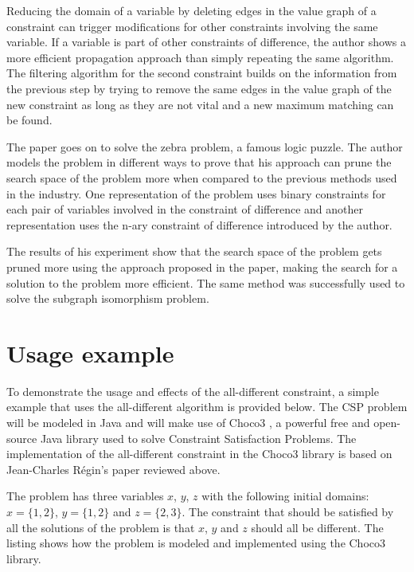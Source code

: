 \documentclass{l4proj}
\begin{document}
\noindent Reducing the domain of a variable by deleting edges in the value graph of a constraint can trigger modifications for other constraints involving the same variable. If a variable is part of other constraints of difference, the author shows a more efficient propagation approach than simply repeating the same algorithm. The filtering algorithm for the second constraint builds on the information from the previous step by trying to remove the same edges in the value graph of the new constraint as long as they are not vital and a new maximum matching can be found.

\noindent The paper goes on to solve the zebra problem, a famous logic puzzle. The author models the problem in different ways to prove that his approach can prune the search space of the problem more when compared to the previous methods used in the industry. One representation of the problem uses binary constraints for each pair of variables involved in the constraint of difference and another representation uses the n-ary constraint of difference introduced by the author. 

\noindent The results of his experiment show that the search space of the problem gets pruned more using the approach proposed in the paper, making the search for a solution to the problem more efficient. The same method was successfully used to solve the subgraph isomorphism problem. 

\section{Usage example}
\noindent To demonstrate the usage and effects of the all-different constraint, a simple example that uses the all-different algorithm is provided below. The CSP problem will be modeled in Java and will make use of Choco3 \cite{choco}, a powerful free and open-source Java library used to solve Constraint Satisfaction Problems. The implementation of the all-different constraint in the Choco3 library is based on Jean-Charles R\'egin's paper \cite{regin1994filtering} reviewed above.

\noindent The problem has three variables $x$, $y$, $z$ with the following initial domains: $x = \{1, 2\}$, $y = \{1, 2\}$ and $z = \{2, 3\}$. The constraint that should be satisfied by all the solutions of the problem is that $x$, $y$ and $z$ should all be different. The listing  shows how the problem is modeled and implemented using the Choco3 library.
\end{document}
